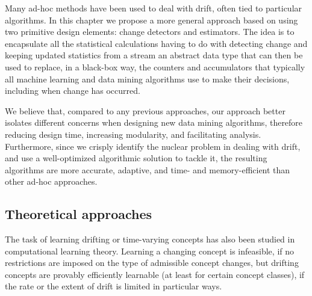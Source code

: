 Many ad-hoc methods have been used to deal with drift, often tied to particular algorithms. 
In this chapter we propose a more general approach based on using two primitive design 
elements: change detectors and estimators. 
The idea is to 
encapsulate all the statistical calculations having to do with detecting change and keeping
updated statistics from a stream an abstract data type that can then be used to replace, 
in a black-box way, the counters and accumulators that typically all machine learning
and data mining algorithms use to make their decisions, including when change has occurred. 

We believe that, compared to any previous approaches, our approach better isolates different
concerns when designing new data mining algorithms, therefore reducing design time,
increasing modularity, and facilitating analysis. Furthermore, since we crisply identify
the nuclear problem in dealing with drift, and use a well-optimized algorithmic solution to tackle it,
the resulting algorithms are more accurate, adaptive, and time- and memory-efficient than other
ad-hoc approaches. %

\subsection{Theoretical approaches}%

The task of learning drifting or time-varying concepts has also been studied
 in computational learning theory. Learning a changing concept is infeasible,
 if no restrictions are imposed on the type of admissible concept changes,  
but drifting concepts are provably efficiently learnable (at least for certain 
concept classes), if the rate or the extent of drift is limited in particular ways. 


